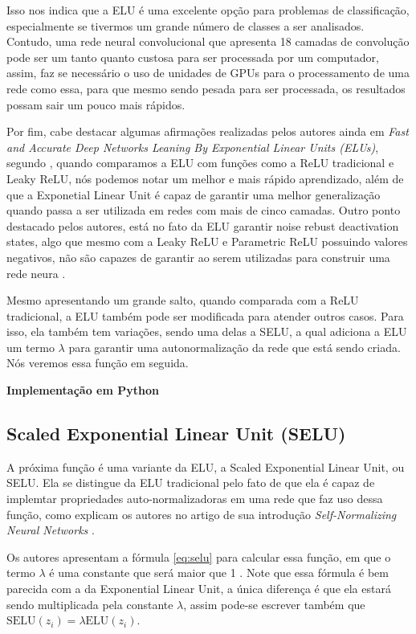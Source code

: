 Isso nos indica que a ELU é uma excelente opção para problemas de classificação, especialmente se tivermos um grande número de classes a ser analisados. Contudo, uma rede neural convolucional que apresenta 18 camadas de convolução pode ser um tanto quanto custosa para ser processada por um computador, assim, faz se necessário o uso de unidades de GPUs para o processamento de uma rede como essa, para que mesmo sendo pesada para ser processada, os resultados possam sair um pouco mais rápidos.

Por fim, cabe destacar algumas afirmações realizadas pelos autores ainda em \textit{Fast and Accurate Deep Networks Leaning By Exponential Linear Units (ELUs)}, segundo \textcite{ELUArticle}, quando comparamos a ELU com funções como a ReLU tradicional e Leaky ReLU, nós podemos notar um melhor e mais rápido aprendizado, além de que a Exponetial Linear Unit é capaz de garantir uma melhor generalização quando passa a ser utilizada em redes com mais de cinco camadas. Outro ponto destacado pelos autores, está no fato da ELU garantir noise rebust deactivation states, algo que mesmo com a Leaky ReLU e Parametric ReLU possuindo valores negativos, não são capazes de garantir ao serem utilizadas para construir uma rede neura \parencite{ELUArticle}.

Mesmo apresentando um grande salto, quando comparada com a ReLU tradicional, a ELU também pode ser modificada para atender outros casos. Para isso, ela também tem variações, sendo uma delas a SELU, a qual adiciona a ELU um termo $\lambda$ para garantir uma autonormalização da rede que está sendo criada. Nós veremos essa função em seguida.

\textbf{Implementação em Python}

\subsection{Scaled Exponential Linear Unit (SELU)}

A próxima função é uma variante da ELU, a Scaled Exponential Linear Unit, ou SELU. Ela se distingue da ELU tradicional pelo fato de que ela é capaz de implemtar propriedades auto-normalizadoras em uma rede que faz uso dessa função, como explicam os autores no artigo de sua introdução \textit{Self-Normalizing Neural Networks} \parencite{SELUArticle}.

 Os autores apresentam a fórmula \ref{eq:selu} para calcular essa função, em que o termo $\lambda$ é uma constante que será maior que 1 \parencite{SELUArticle}. Note que essa fórmula é bem parecida com a da Exponential Linear Unit, a única diferença é que ela estará sendo multiplicada pela constante $\lambda$, assim pode-se escrever também que $\text{SELU}(z_i) = \lambda \text{ELU}(z_i)$.

